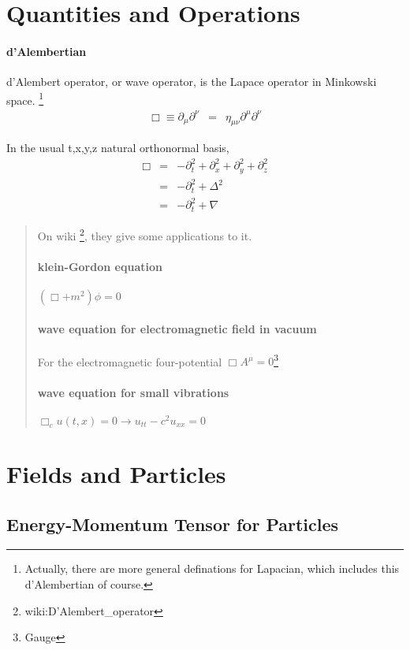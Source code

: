 \documentclass[12pt,a4paper]{book}
\begin{document}
\section{Quantities and Operations}

\paragraph{d'Alembertian}
d'Alembert operator, or wave operator, is the Lapace operator in Minkowski space.
\footnote{Actually, there are more general definations for Lapacian, which includes this d'Alembertian of course.}
\begin{eqnarray}
\Box\equiv \partial_\mu\partial^\nu&=&\eta_{\mu\nu}\partial^\mu \partial^\nu
\end{eqnarray}

In the usual {t,x,y,z} natural orthonormal basis,
\begin{eqnarray}
 \Box&=&-\partial_t^2+\partial_x^2+\partial_y^2+\partial_z^2 \\
&=&-\partial_t^2+\Delta^2 \\
&=&-\partial_t^2+\nabla
\end{eqnarray}

\begin{quotation}
On wiki \footnote{wiki:D'Alembert\_operator}, they give some applications to it.
\paragraph{klein-Gordon equation} $(\Box+m^2)\phi=0$
\paragraph{wave equation for electromagnetic field in vacuum} For the electromagnetic four-potential $\Box A^\mu=0$\footnote{Gauge}
\paragraph{wave equation for small vibrations} $\Box_c u(t,x)=0\rightarrow u_{tt}-c^2 u_{xx}=0$
\end{quotation}




\section{Fields and Particles}

\subsection{Energy-Momentum Tensor for Particles}
\end{document}
